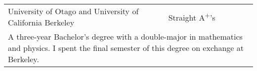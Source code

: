 \documentclass[10pt,a4paper,final]{article}
\begin{document}
\begin{tabularx}{\textwidth}{l l l l l}
   \multicolumn{1}{m{0.25\textwidth}}{University of \mbox{Otago} and \mbox{University} of \mbox{California} Berkeley} & Straight A\textsuperscript{+}'s                                                                                                              \\
   \multicolumn{5}{X}{\cellcolor{seaborn_bg_grey_half}%
      A three-year Bachelor's degree with a double-major in mathematics and physics. I spent the final semester of this degree on exchange at Berkeley.
   }                                                                                                                                                                                                                                                                 \\
\end{tabularx}
\end{document}
